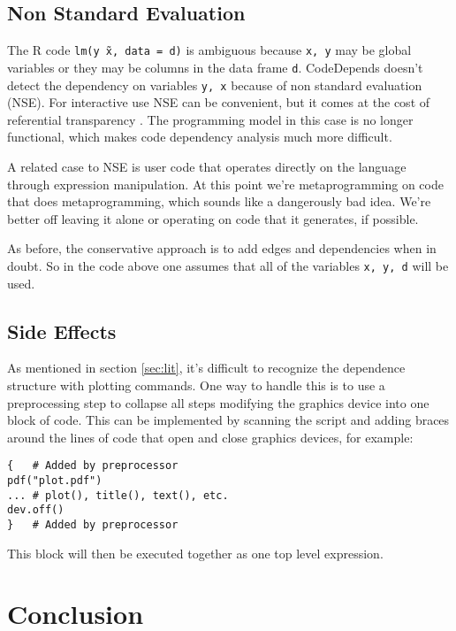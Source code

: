 \documentclass[12pt]{article}
\begin{document}
\subsection{Non Standard Evaluation}

The R code \texttt{lm(y \~ x, data = d)} is ambiguous because \texttt{x, y}
may be global variables or they may be columns in the data frame
\texttt{d}. CodeDepends doesn't detect the dependency on variables
\texttt{y, x} because of non standard evaluation (NSE). For interactive use
NSE can be convenient, but it comes at the cost of referential
transparency \cite{wickham2015advanced}. The programming model in this case
is no longer functional, which makes code dependency analysis much more
difficult.

A related case to NSE is user code that operates directly on the language
through expression manipulation. At this point we're metaprogramming on
code that does metaprogramming, which sounds like a dangerously bad idea.
We're better off leaving it alone or operating on code that it generates,
if possible.

As before, the conservative approach is to add edges and dependencies when in
doubt. So in the code above one assumes that all of the variables
\texttt{x, y, d} will be used.

\subsection{Side Effects}

As mentioned in section \ref{sec:lit}, it's difficult to recognize the
dependence structure with plotting commands. One way to handle this is to
use a preprocessing step to collapse all steps modifying the graphics
device into one block of code. This can be implemented by scanning the
script and adding braces around the lines of code that open and close
graphics devices, for example:

\begin{verbatim}
{   # Added by preprocessor
pdf("plot.pdf")
... # plot(), title(), text(), etc.
dev.off()
}   # Added by preprocessor
\end{verbatim}

This block will then be executed together as one top level expression.

\section{Conclusion}
\end{document}
